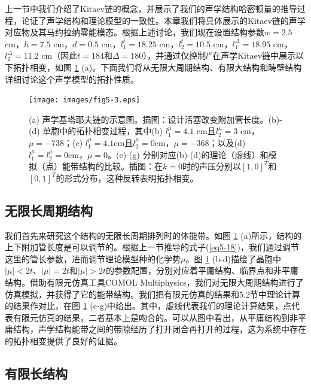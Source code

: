 上一节中我们介绍了Kitaev链的概念，并展示了我们的声学结构哈密顿量的推导过程，论证了声学结构和理论模型的一致性。本章我们将具体展示的Kitaev链的声学对应物及其马约拉纳零能模态。根据上述讨论，我们现在设置结构参数\(w = 2.5\) cm，\(h = 7.5\) cm，\(d = 0.5\) cm，\(l_{1}^{t} = 18.25\) cm，\(l_{2}^{t} = 10.5\) cm，\(l_{1}^{\Delta} = 18.95\) cm，\(l_{2}^{\Delta} = 11.2\) cm（因此\(t = 184\)和\({\Delta} = 180\)），并通过仅控制\(l^{\mu}\)在声学Kitaev链中展示以下拓扑相变，如图 \ref{fig_5_3} (a)。下面我们将从无限大周期结构、有限大结构和畴壁结构详细讨论这个声学模型的拓扑性质。

\begin{figure}[h!]
    \centering
    \texttt{[image: images/fig5-3.eps]} 
    \caption{(a) 声学基塔耶夫链的示意图。插图：设计活塞改变附加管长度。(b)-(d) 单胞中的拓扑相变过程，其中(b) $l_1^{\mu} = 4.1$ cm且$l_2^{\mu} = 3$ cm，$\mu = -738$；(c) $l_1^{\mu} = 4.1$cm且$l_2^{\mu} = 0$cm，$\mu = -368$；以及(d) $l_1^{\mu} = l_2^{\mu} = 0$cm，$\mu = 0$。(e)-(g) 分别对应(b)-(d)的理论（虚线）和模拟（点）能带结构的比较。插图：在$k = 0$时的声压分别以$[1, 0]^T$和$[0, 1]^T$的形式分布，这种反转表明拓扑相变。}
    \label{fig_5_3}
\end{figure}

\subsection{无限长周期结构}

我们首先来研究这个结构的无限长周期排列时的体能带。如图 \ref{fig_5_3} (a)所示，结构的上下附加管长度是可以调节的。根据上一节推导的式子(\ref{eq5-18})，我们通过调节这里的管长参数，进而调节理论模型种的化学势$\mu$。图 \ref{fig_5_3} (b-d)描绘了晶胞中\(\vert \mu \vert < 2t\)、\(\vert \mu \vert = 2t\)和\(\vert \mu \vert > 2t\)的参数配置，分别对应着平庸结构、临界点和非平庸结构。借助有限元仿真工具COMOL Multiphysics，我们对无限大周期结构进行了仿真模拟，并获得了它的能带结构。我们把有限元仿真的结果和5.2节中理论计算的结果作对比，在图 \ref{fig_5_3} (e-g)中给出。其中，虚线代表我们的理论计算结果，点代表有限元仿真的结果，二者基本上是吻合的。可以从图中看出，从平庸结构到非平庸结构，声学结构能带之间的带隙经历了打开闭合再打开的过程，这为系统中存在的拓扑相变提供了良好的证据。

\subsection{有限长结构}

